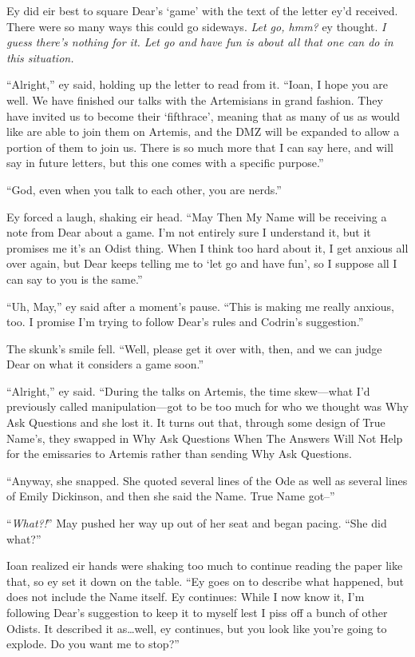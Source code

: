 Ey did eir best to square Dear's `game' with the text of the letter ey'd received. There were so many ways this could go sideways. \emph{Let go, hmm?} ey thought. \emph{I guess there's nothing for it. Let go and have fun is about all that one can do in this situation.}

``Alright,'' ey said, holding up the letter to read from it. ``Ioan, I hope you are well. We have finished our talks with the Artemisians in grand fashion. They have invited us to become their `fifthrace', meaning that as many of us as would like are able to join them on Artemis, and the DMZ will be expanded to allow a portion of them to join us. There is so much more that I can say here, and will say in future letters, but this one comes with a specific purpose.''

``God, even when you talk to each other, you are nerds.''

Ey forced a laugh, shaking eir head. ``May Then My Name will be receiving a note from Dear about a game. I'm not entirely sure I understand it, but it promises me it's an Odist thing. When I think too hard about it, I get anxious all over again, but Dear keeps telling me to `let go and have fun', so I suppose all I can say to you is the same.''

``Uh, May,'' ey said after a moment's pause. ``This is making me really anxious, too. I promise I'm trying to follow Dear's rules and Codrin's suggestion.''

The skunk's smile fell. ``Well, please get it over with, then, and we can judge Dear on what it considers a game soon.''

``Alright,'' ey said. ``During the talks on Artemis, the time skew—what I'd previously called manipulation—got to be too much for who we thought was Why Ask Questions and she lost it. It turns out that, through some design of True Name's, they swapped in Why Ask Questions When The Answers Will Not Help for the emissaries to Artemis rather than sending Why Ask Questions.

``Anyway, she snapped. She quoted several lines of the Ode as well as several lines of Emily Dickinson, and then she said the Name. True Name got--''

``\emph{What?!}'' May pushed her way up out of her seat and began pacing. ``She did what?''

Ioan realized eir hands were shaking too much to continue reading the paper like that, so ey set it down on the table. ``Ey goes on to describe what happened, but does not include the Name itself. Ey continues: While I now know it, I'm following Dear's suggestion to keep it to myself lest I piss off a bunch of other Odists. It described it as\ldots well, ey continues, but you look like you're going to explode. Do you want me to stop?''

